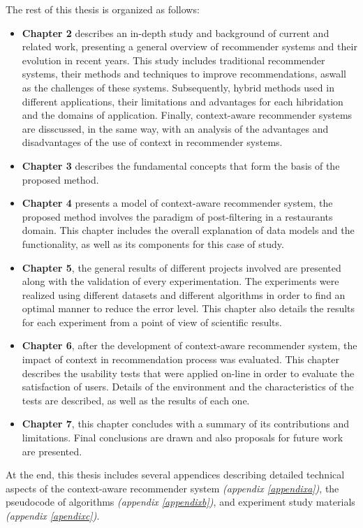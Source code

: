 The rest of this thesis is organized as follows: 
\begin{itemize}  
\item \textbf{Chapter 2} describes an in-depth study
and background of current and related work, presenting a general
overview of recommender systems and their evolution in recent years.
This study includes traditional recommender systems, their methods
and techniques to improve recommendations, aswall as the challenges 
of these systems. Subsequently, hybrid methods used in different
applications, their limitations and advantages for each hibridation and
the domains of application. Finally, context-aware recommender systems
are disscussed, in the same way,  with an analysis of the advantages and
disadvantages of the use of context in recommender systems.
\item \textbf{Chapter 3} describes the fundamental
concepts that form the basis of the proposed method.
\item \textbf{Chapter 4} presents a model of context-aware
recommender system, the proposed method involves the paradigm of
post-filtering in a restaurants domain. This chapter includes the
overall explanation of data models and  the functionality, as
well as its components for this case of study.
\item \textbf {Chapter 5}, the general results of different
projects involved are presented along with the validation of every
experimentation. The experiments were realized using different
datasets and different algorithms in order to find an optimal manner
to reduce the error level. This chapter also details the results for
each experiment from a point of view of scientific results.
\item \textbf {Chapter 6}, after the development of
context-aware recommender system, the impact of
context in recommendation process was evaluated. 
This chapter describes the
usability tests that were applied on-line in order to evaluate the
satisfaction of users. Details of the environment and the
characteristics of the tests are described, as well as 
the results of each one.
\item \textbf {Chapter 7}, this chapter concludes with a
summary of its contributions and limitations. Final
conclusions are drawn and also proposals for future work are presented.
\end{itemize}  

At the end, this thesis includes several appendices describing
detailed technical aspects of the context-aware recommender system
 \textit{(appendix \ref{appendixa})}, the pseudocode of algorithms
 \textit{(appendix \ref{appendixb})}, and experiment study materials 
 \textit{(appendix \ref{apendixc})}.
